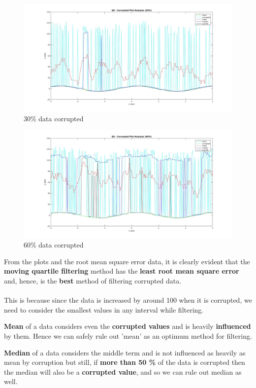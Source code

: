 \documentclass[12pt]{article}
\begin{document}
\begin{figure}[h!]
	\includegraphics[width=\linewidth]{30.jpg}
	\caption{30\% data corrupted}
	\label{fig:5.1}
\end{figure}
\begin{figure}[h!]
	\includegraphics[width=\linewidth]{60.jpg}
	\caption{60\% data corrupted}
	\label{fig:5.2}
\end{figure}
\newpage
From the plots and the root mean square error data, it is clearly evident that the \textbf{moving quartile filtering} method has the \textbf{least root mean square error} and, hence, is the \textbf{best} method of filtering corrupted data.
\\ \\
This is because since the data is increased by around 100 when it is corrupted, we need to consider the smallest values in any interval while filtering. 


\textbf{Mean} of a data considers even the \textbf{corrupted values} and is heavily \textbf{influenced} by them. Hence we can safely rule out 'mean' as an optimum method for filtering.
 
 
\textbf{Median} of a data considers the middle term and is not influenced as heavily as mean by corruption but still, if \textbf{more than 50 \%} of the data is corrupted then the median will also be a \textbf{corrupted value}, and so we can rule out median as well.
\end{document}
